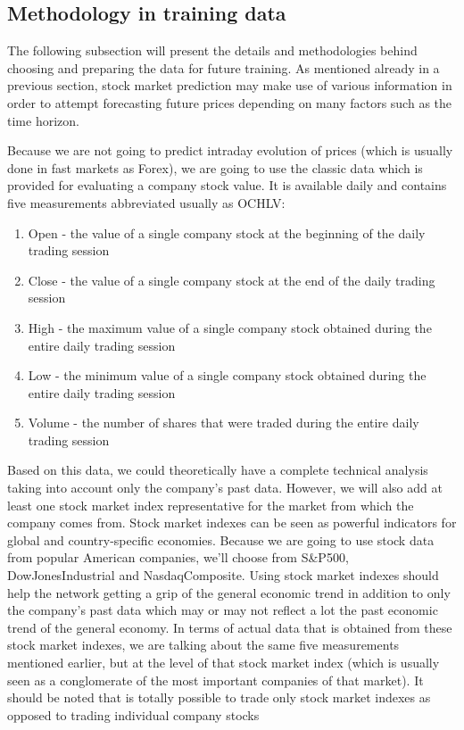 \subsection{Methodology in training data}
The following subsection will present the details and methodologies behind choosing and preparing the data for future training. As mentioned already in a previous section, stock market prediction may make use of various information in order to attempt forecasting future prices depending on many factors such as the time horizon.

Because we are not going to predict intraday evolution of prices (which is usually done in fast markets as Forex), we are going to use the classic data which is provided for evaluating a company stock value. It is available daily and contains five measurements abbreviated usually as OCHLV:
\begin{enumerate}
    \item Open - the value of a single company stock at the beginning of the daily trading session
    \item Close - the value of a single company stock at the end of the daily trading session
    \item High - the maximum value of a single company stock obtained during the entire daily trading session
    \item Low - the minimum value of a single company stock obtained during the entire daily trading session
    \item Volume - the number of shares that were traded during the entire daily trading session
\end{enumerate}
Based on this data, we could theoretically have a complete technical analysis taking into account only the company's past data. However, we will also add at least one stock market index representative for the market from which the company comes from. Stock market indexes can be seen as powerful indicators for global and country-specific economies. Because we are going to use stock data from popular American companies, we'll choose from S\&P500, DowJonesIndustrial and NasdaqComposite. Using stock market indexes should help the network getting a grip of the general economic trend in addition to only the company's past data which may or may not reflect a lot the past economic trend of the general economy. In terms of actual data that is obtained from these stock market indexes, we are talking about the same five measurements mentioned earlier, but at the level of that stock market index (which is usually seen as a conglomerate of the most important companies of that market). It should be noted that is totally possible to trade only stock market indexes as opposed to trading individual company stocks

